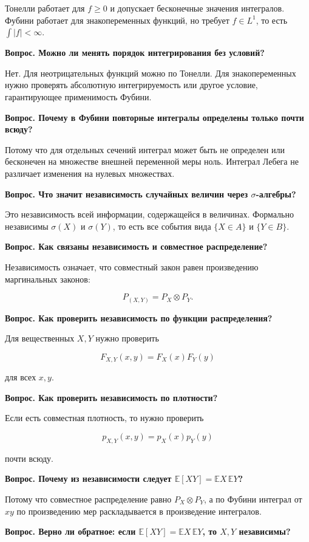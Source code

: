\documentclass[
  11pt,
  a4paper,
]{article}
\begin{document}
Тонелли работает для \(f\ge0\) и допускает бесконечные значения
интегралов. Фубини работает для знакопеременных функций, но требует
\(f\in L^1\), то есть \(\int |f|<\infty\).

\textbf{Вопрос. Можно ли менять порядок интегрирования без условий?}

Нет. Для неотрицательных функций можно по Тонелли. Для знакопеременных
нужно проверять абсолютную интегрируемость или другое условие,
гарантирующее применимость Фубини.

\textbf{Вопрос. Почему в Фубини повторные интегралы определены только
почти всюду?}

Потому что для отдельных сечений интеграл может быть не определен или
бесконечен на множестве внешней переменной меры ноль. Интеграл Лебега не
различает изменения на нулевых множествах.

\textbf{Вопрос. Что значит независимость случайных величин через
\(\sigma\)-алгебры?}

Это независимость всей информации, содержащейся в величинах. Формально
независимы \(\sigma(X)\) и \(\sigma(Y)\), то есть все события вида
\(\{X\in A\}\) и \(\{Y\in B\}\).

\textbf{Вопрос. Как связаны независимость и совместное распределение?}

Независимость означает, что совместный закон равен произведению
маргинальных законов:

\[
P_{(X,Y)}=P_X\otimes P_Y.
\]

\textbf{Вопрос. Как проверить независимость по функции распределения?}

Для вещественных \(X,Y\) нужно проверить

\[
F_{X,Y}(x,y)=F_X(x)F_Y(y)
\]

для всех \(x,y\).

\textbf{Вопрос. Как проверить независимость по плотности?}

Если есть совместная плотность, то нужно проверить

\[
p_{X,Y}(x,y)=p_X(x)p_Y(y)
\]

почти всюду.

\textbf{Вопрос. Почему из независимости следует
\(\mathbb E[XY]=\mathbb EX\,\mathbb EY\)?}

Потому что совместное распределение равно \(P_X\otimes P_Y\), а по
Фубини интеграл от \(xy\) по произведению мер раскладывается в
произведение интегралов.

\textbf{Вопрос. Верно ли обратное: если
\(\mathbb E[XY]=\mathbb EX\,\mathbb EY\), то \(X,Y\) независимы?}
\end{document}
